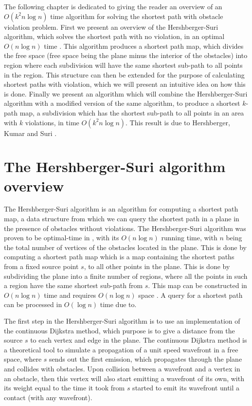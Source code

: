 The following chapter is dedicated to giving the reader an overview of an $O(k^2 n \log n)$ 
time algorithm for solving the shortest path with obstacle violation problem. First we present an 
overview of the Hershberger-Suri algorithm, which solves the shortest path with no violation, 
in an optimal $O(n \log n)$ time \cite{HershbergerS99}. This algorithm produces a shortest 
path map, which divides the free space (free space being the plane minus the interior of the 
obstacles) into region where each subdivision will have the same shortest sub-path to 
all points in the region. This structure can then be extended for the purpose of calculating 
shortest paths with violation, which we will present an intuitive idea on how this is done. 
Finally we present an algorithm which will combine the Hershberger-Suri algorithm with a 
modified version of the same algorithm, to produce a shortest $k$-path map, a subdivision 
which has the shortest sub-path to all points in an area with $k$ violations, in time $O(k^2 
n \log n)$. This result is due to Hershberger, Kumar and Suri \cite{HershbergerKS17}.

\section{The Hershberger-Suri algorithm overview}

The Hershberger-Suri algorithm is an algorithm for computing a shortest path map, a
data structure from which we can query the shortest path in a plane in the presence of 
obstacles without violations. The Hershberger-Suri algorithm was proven to be optimal-time 
in \cite{HershbergerS99}, with its $O(n \log n)$ running time, with $n$ being the total number of vertices 
of the obstacles located in the plane. This is done by computing a shortest path map 
which is  a map containing the shortest paths from a fixed source point $s$, to all 
other points in the plane. This is done by subdividing the plane into a finite number
of regions, where all the points in such a region have the same shortest sub-path
from $s$. This map can be constructed in $O(n\log n)$ time and requires $O(n\log n)$ 
space \cite{HershbergerS99}. A query for a shortest path can be processed in $O(\log n)$
time due to\cite{DBLP:journals/siamcomp/Kirkpatrick83}. 

The first step in the Hershberger-Suri algorithm is to use an implementation of
the continuous Dijkstra method, which purpose is to give a distance from the
source $s$ to each vertex and edge in the plane. The continuous Dijkstra method
is a theoretical tool to simulate a propagation of a unit speed wavefront in a
free space, where $s$ sends out the first emission, which propagates through
the plane and collides with obstacles. Upon collision between a wavefront and
a vertex in an obstacle, then this vertex will also start emitting a wavefront
of its own, with its weight equal to the time it took from $s$ started to emit
its wavefront until a contact (with any wavefront). 


